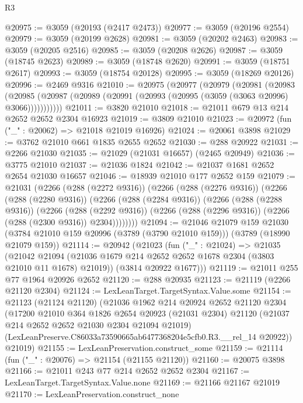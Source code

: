 \begin{lexlean}{R3}
\begin{coremodule}
@20975 := @3059 (@20193 (@2417 @2473))
@20977 := @3059 (@20196 @2554)
@20979 := @3059 (@20199 @2628)
@20981 := @3059 (@20202 @2463)
@20983 := @3059 (@20205 @2516)
@20985 := @3059 (@20208 @2626)
@20987 := @3059 (@18745 @2623)
@20989 := @3059 (@18748 @2620)
@20991 := @3059 (@18751 @2617)
@20993 := @3059 (@18754 @20128)
@20995 := @3059 (@18269 @20126)
@20996 := @2469 @9316
@21010 := @20975
    (@20977
      (@20979
        (@20981
          (@20983
            (@20985 (@20987 (@20989 (@20991 (@20993 (@20995 (@3059 (@3063 @20996) @3066)))))))))))
@21011 := @3820 @21010
@21018 := @21011 @679 @13 @214 @2652 @2652 @2304 @16923
@21019 := @3809 @21010
@21023 := @20972 (fun ("_" : @20062) => @21018 @21019 @16926)
@21024 := @20061 @3898
@21029 := @3762 @21010 @661 @1835 @2655 @2652
@21030 := @288 @20922
@21031 := @2266 @21030
@21035 := @21029 (@21031 @16657) (@2465 @20949)
@21036 := @3775 @21010
@21037 := @21036 @1824
@21042 := @21037 @1681 @2652 @2654 @21030 @16657
@21046 := @18939 @21010 @177 @2652 @159
@21079 := @21031
    (@2266
      (@288 (@2272 @9316))
      (@2266
        (@288 (@2276 @9316))
        (@2266
          (@288 (@2280 @9316))
          (@2266
            (@288 (@2284 @9316))
            (@2266
              (@288 (@2288 @9316))
              (@2266
                (@288 (@2292 @9316))
                (@2266 (@288 (@2296 @9316)) (@2266 (@288 (@2300 @9316)) @2304))))))))
@21094 := @21046
    @21079
    @159
    @21030
    (@3784 @21010 @159 @20996 (@3789 (@3790 @21010 @159)))
    (@3789 (@18990 @21079 @159))
@21114 := @20942
    (@21023
      (fun ("_" : @21024) =>
      @21035
        (@21042 @21094 (@21036 @1679 @214 @2652 @2652 @1678 @2304 (@3803 @21010 @11 @1678) @21019))
        (@3814 @20922 @1677)))
@21119 := @21011 @255 @77 @1964 @20926 @2652
@21120 := @288 @20935
@21123 := @21119 (@2266 @21120 @2304)
@21124 := LexLeanTarget.TargetSyntax.Value.some
@21154 := @21123
    (@21124 @21120)
    (@21036
      @1962
      @214
      @20924
      @2652
      @21120
      @2304
      (@17200
        @21010
        @364
        @1826
        @2654
        @20923
        (@21031 @2304)
        @21120
        (@21037 @214 @2652 @2652 @21030 @2304 @21094 @21019)
        (LexLeanPreserve.C86033a73590665ab6477368204e5cfb0.R3.__rel_14 @20922))
      @21019)
@21155 := LexLeanPreservation.construct_some
@21159 := @21114 (fun ("_" : @20076) => @21154 (@21155 @21120))
@21160 := @20075 @3898
@21166 := @21011 @243 @77 @214 @2652 @2652 @2304
@21167 := LexLeanTarget.TargetSyntax.Value.none
@21169 := @21166 @21167 @21019
@21170 := LexLeanPreservation.construct_none

\end{coremodule}
\end{lexlean}
